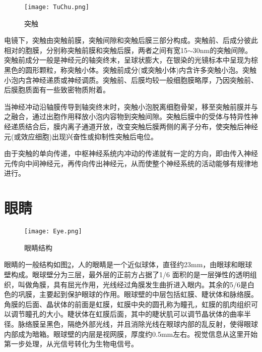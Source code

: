 \documentclass[a4paper,10pt]{article}\large
\begin{document}
\begin{figure}[htb]
\centering

\par \hspace{2ex}
\texttt{[image: TuChu.png]}
\caption{突触}\label{fig 3} 
\end{figure}

电镜下，突触由突触前膜，突触间隙和突触后膜三部分构成。突触前、后成分彼此相对的胞膜，分别称突触前膜和突触后膜，两者之间有宽15$\sim$30nm的突触间隙。突触前成分一般是神经元的轴突终末，呈球状膨大，在银染的光镜标本中呈现为棕黑色的圆形颗粒，称突触小体。突触前成分(或突触小体)内含许多突触小泡。突触小泡内含神经递质或神经调质。突触前、后膜均较一般细胞膜略厚，乃因突触前、后膜胞质面有一些致密物质附着。


当神经冲动沿轴膜传导到轴突终末时，突触小泡脱离细胞骨架，移至突触前膜并与之融合，通过出胞作用释放小泡内容物到突触间隙。突触后膜中的受体与特异性神经递质结合后，膜内离子通道开放，改变突触后膜两侧的离子分布，使突触后神经元(或效应细胞)出现兴奋性或抑制性突触后电位。


由于突触的单向传递，中枢神经系统内冲动的传递就有一定的方向，即由传入神经元传向中间神经元，再传向传出神经元，从而使整个神经系统的活动能够有规律地进行。


\section{眼睛}

\begin{figure}[htb]
\centering

\par \hspace{2ex}
\texttt{[image: Eye.png]}
\caption{眼睛结构}\label{fig 4} 
\end{figure}

眼睛\cite{11:misc}的一般结构如图\ref{fig 4}，人的眼睛是一个近似球体，直径约23mm，由眼球和眼球壁构成。眼球壁分为三层，最外层的正前方占据了1/6 面积的是一层弹性的透明组织，叫做角膜，具有屈光作用，光线经过角膜发生曲折进入眼内。其余的5/6是白色的巩膜，主要起到保护眼球的作用。眼球壁的中层包括虹膜、睫状体和脉络膜。角膜的后面、晶状体的前面是虹膜，虹膜中央的圆孔称为瞳孔，虹膜的肌肉组织可以调节瞳孔的大小。睫状体在虹膜后面，其中的睫状肌可以调节晶状体的曲率半径。脉络膜呈黑色，隔绝外部光线，并且消除光线在眼球内部的乱反射，使得眼球内部成为暗箱。眼球壁的内层是视网膜，厚度约0.5mm左右。视觉信息从这里开始第一步处理，从光信号转化为生物电信号\cite{16:book}。
\end{document}
